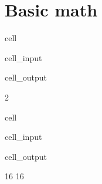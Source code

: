 \documentclass[letterpaper,10pt,english]{jupyterBook}
\begin{document}
\section{Basic math}
\label{\detokenize{notebooks/getting_started/basic_math:basic-math}}
\begin{sphinxuseclass}{cell}\begin{sphinxVerbatimInput}

\begin{sphinxuseclass}{cell_input}
\begin{sphinxVerbatim}[commandchars=\\\{\}]
    
\end{sphinxVerbatim}

\end{sphinxuseclass}\end{sphinxVerbatimInput}
\begin{sphinxVerbatimOutput}

\begin{sphinxuseclass}{cell_output}
\begin{sphinxVerbatim}[commandchars=\\\{\}]
2
\end{sphinxVerbatim}

\end{sphinxuseclass}\end{sphinxVerbatimOutput}

\end{sphinxuseclass}
\begin{sphinxuseclass}{cell}\begin{sphinxVerbatimInput}

\begin{sphinxuseclass}{cell_input}
\begin{sphinxVerbatim}[commandchars=\\\{\}]
     
    
\end{sphinxVerbatim}

\end{sphinxuseclass}\end{sphinxVerbatimInput}
\begin{sphinxVerbatimOutput}

\begin{sphinxuseclass}{cell_output}
\begin{sphinxVerbatim}[commandchars=\\\{\}]
16
16
\end{sphinxVerbatim}

\end{sphinxuseclass}\end{sphinxVerbatimOutput}

\end{sphinxuseclass}
\end{document}
